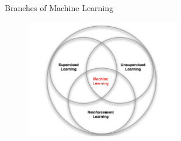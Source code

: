 \bgroup
\begin{frame}{Branches of Machine Learning}
\begin{figure}
\centering
\includegraphics[width=0.6\textwidth]{img/ml_taxonomy.pdf}
\end{figure}
\end{frame}
\egroup